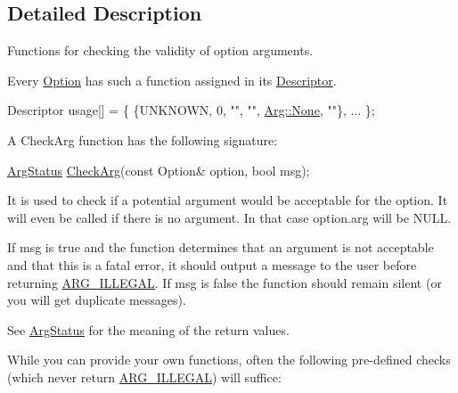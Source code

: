 \subsection{Detailed Description}
Functions for checking the validity of option arguments. 

Every \hyperlink{classoption_1_1Option}{Option} has such a function assigned in its \hyperlink{structoption_1_1Descriptor}{Descriptor}. 
\begin{DoxyCode}
Descriptor usage[] = \{ \{UNKNOWN, 0, \textcolor{stringliteral}{""}, \textcolor{stringliteral}{""}, \hyperlink{structoption_1_1Arg_a7fc01987899c91c6b6a1be5711a46e22}{Arg::None}, \textcolor{stringliteral}{""}\}, ... \};
\end{DoxyCode}


A Check\+Arg function has the following signature\+: 
\begin{DoxyCode}
\hyperlink{namespaceoption_aee8c76a07877335762631491e7a5a1a9}{ArgStatus} \hyperlink{namespaceoption_a4cdf403efae65e18bf850e2001b12a2a}{CheckArg}(\textcolor{keyword}{const} Option& option, \textcolor{keywordtype}{bool} msg); 
\end{DoxyCode}


It is used to check if a potential argument would be acceptable for the option. It will even be called if there is no argument. In that case {\ttfamily option.\+arg} will be {\ttfamily N\+U\+LL}.

If {\ttfamily msg} is {\ttfamily true} and the function determines that an argument is not acceptable and that this is a fatal error, it should output a message to the user before returning \hyperlink{namespaceoption_aee8c76a07877335762631491e7a5a1a9a9528e32563b795bd2930b12d0a5e382d}{A\+R\+G\+\_\+\+I\+L\+L\+E\+G\+AL}. If {\ttfamily msg} is {\ttfamily false} the function should remain silent (or you will get duplicate messages).

See \hyperlink{namespaceoption_aee8c76a07877335762631491e7a5a1a9}{Arg\+Status} for the meaning of the return values.

While you can provide your own functions, often the following pre-\/defined checks (which never return \hyperlink{namespaceoption_aee8c76a07877335762631491e7a5a1a9a9528e32563b795bd2930b12d0a5e382d}{A\+R\+G\+\_\+\+I\+L\+L\+E\+G\+AL}) will suffice\+:

